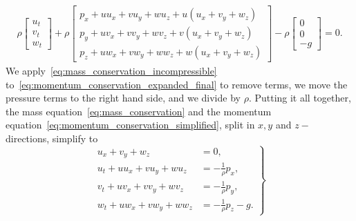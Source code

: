 \begin{align}\label{eq:momentum_conservation_expanded_final}
    \rho \begin{bmatrix}
        u_t \\ v_t \\ w_t
    \end{bmatrix}
    + \rho \begin{bmatrix}
        p_x + u u_x + v u_y + w u_z + u(u_x + v_y + w_z) \\
        p_y + u v_x + v v_y + w v_z + v(u_x + v_y + w_z) \\
        p_z + u w_x + v w_y + w w_z + w(u_x + v_y + w_z) 
    \end{bmatrix}
    - \rho \begin{bmatrix}
        0 \\ 0 \\ -g
    \end{bmatrix} = 0.
\end{align}
We apply~\eqref{eq:mass_conservation_incompressible} to~\eqref{eq:momentum_conservation_expanded_final} to remove terms, we move the pressure terms to the right hand side, and we divide by $\rho$.
Putting it all together, the mass equation~\eqref{eq:mass_conservation} and the momentum equation~\eqref{eq:momentum_conservation_simplified}, split in $x, y$ and $z-$directions, simplify to 
\begin{equation}\label{eq:momentum_conservation_all}
    \left.
    \begin{aligned}
        u_x + v_y + w_z &= 0, \\
        u_t + u u_x + v u_y + w u_z &= - \frac{1}{\rho} p_x, \\
        v_t + u v_x + v v_y + w v_z &= - \frac{1}{\rho} p_y, \\
        w_t + u w_x + v w_y + w w_z &= - \frac{1}{\rho} p_z - g.
    \end{aligned}
    \right\}
\end{equation}


